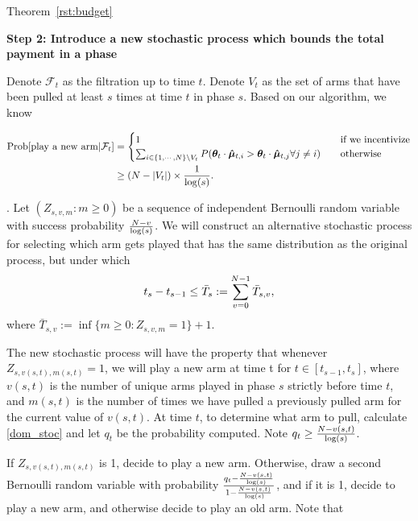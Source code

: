 \begin{extraproof}{Theorem~\ref{rst:budget}}
  
\noindent\textbf{Step 2: Introduce a new stochastic process which bounds the total payment in a phase}

Denote $\mathcal{F}_t$ as the filtration up to time $t$. Denote $V_t$ as the set of arms that have been pulled at least $s$ times at time $t$ in phase $s$. Based on our algorithm, we know

\begin{align}
\Prob{\text{play a new arm}|\mathcal{F}_t} & =
\begin{cases}
1       & \quad \text{if we incentivize}\\
\sum_{i\in \{1,\cdots,\ARMNUM\}\setminus V_t} P(\AgentV{t} \cdot \ArmEV{t}{i}>\AgentV{t}\cdot \ArmEV{t}{j} \forall j\neq i)  & \quad \text{otherwise}  
\end{cases} \label{dom_stoc}\\
 & \geq (\ARMNUM-|V_t|)\times \frac{1}{\log(s)}. \nonumber
\end{align}

.
Let $(Z_{s,v,m}:m\geq 0)$ be a sequence of independent Bernoulli random variable with success probability $\frac{N-v}{\log(s)}$. We will construct an alternative stochastic process for selecting which arm gets played that has the same distribution as the original process, but under which
\begin{align*}
t_{s}-t_{s-1}\leq \bar{T}_{s}:=\sum_{v=0}^{N-1}\bar{T}_{s,v}, 
\end{align*}
where $\bar{T}_{s,v}:=\inf\{m\geq 0: Z_{s,v,m}=1\}+1$.

The new stochastic process will have the property that whenever $Z_{s,v(s,t),m(s,t)}=1$, we will play a new arm at time t for $t\in [t_{s-1}, t_{s}]$, where $v(s,t)$ is the number of unique arms played in phase $s$ strictly before time $t$, and $m(s,t)$ is the number of times we have pulled a previously pulled arm for the current value of $v(s,t)$. At time $t$, to determine what arm to pull, calculate \eqref{dom_stoc} and let $q_t$ be the probability computed. Note $q_t\geq \frac{N-v(s,t)}{\log(s)}$.

If $Z_{s,v(s,t),m(s,t)}$ is 1, decide to play a new arm. Otherwise, draw a second Bernoulli random variable with probability $\frac{q_t-\frac{N-v(s,t)}{\log(s)}}{1-\frac{N-v(s,t)}{\log(s)}}$, and if it is 1, decide to play a new arm, and otherwise decide to play an old arm. Note that


\end{extraproof}
